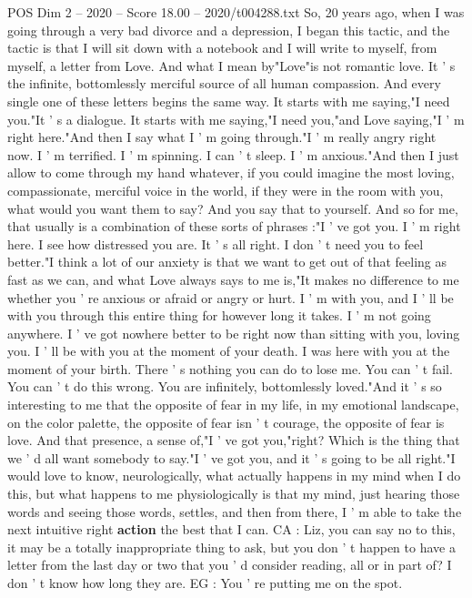 \begin{textsample}{POS Dim 2 – 2020 – Score 18.00 – 2020/t004288.txt}
So, 20 years ago, when I was going through a very bad divorce and a depression, I began this tactic, and the tactic is that I will sit down with a notebook and I will write to myself, from myself, a letter from Love.
And what I mean by"Love"is not romantic love.
It ' s the infinite, bottomlessly merciful source of all human compassion.
And every single one of these letters begins the same way.
It starts with me saying,"I need you."It ' s a dialogue.
It starts with me saying,"I need you,"and Love saying,"I ' m right here."And then I say what I ' m going through."I ' m really angry right now.
I ' m terrified.
I ' m spinning.
I can ' t sleep.
I ' m anxious."And then I just allow to come through my hand whatever, if you could imagine the most loving, compassionate, merciful voice in the world, if they were in the room with you, what would you want them to say?
And you say that to yourself.
And so for me, that usually is a combination of these sorts of phrases :"I ' ve got you.
I ' m right here.
I see how distressed you are.
It ' s all right.
I don ' t need you to feel better."I think a lot of our anxiety is that we want to get out of that feeling as fast as we can, and what Love always says to me is,"It makes no difference to me whether you ' re anxious or afraid or angry or hurt.
I ' m with you, and I ' ll be with you through this entire thing for however long it takes.
I ' m not going anywhere.
I ' ve got nowhere better to be right now than sitting with you, loving you.
I ' ll be with you at the moment of your death.
I was here with you at the moment of your birth.
There ' s nothing you can do to lose me.
You can ' t fail.
You can ' t do this wrong.
You are infinitely, bottomlessly loved."And it ' s so interesting to me that the opposite of fear in my life, in my emotional landscape, on the color palette, the opposite of fear isn ' t courage, the opposite of fear is love.
And that presence, a sense of,"I ' ve got you,"right?
Which is the thing that we ' d all want somebody to say."I ' ve got you, and it ' s going to be all right."I would love to know, neurologically, what actually happens in my mind when I do this, but what happens to me physiologically is that my mind, just hearing those words and seeing those words, settles, and then from there, I ' m able to take the next intuitive right \textbf{action} the best that I can.
CA : Liz, you can say no to this, it may be a totally inappropriate thing to ask, but you don ' t happen to have a letter from the last day or two that you ' d consider reading, all or in part of?
I don ' t know how long they are.
EG : You ' re putting me on the spot.

\end{textsample}
